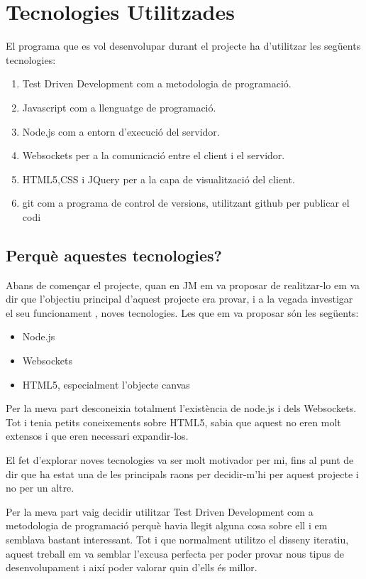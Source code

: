 \chapter{Tecnologies Utilitzades}
\label{sec:tecnologies}

El programa que es vol desenvolupar durant el projecte ha d'utilitzar les següents tecnologies: 

\begin{enumerate}
	\item{Test Driven Development com a metodologia de programació.}
	\item{Javascript com a llenguatge de programació.}
	\item{Node.js com a entorn d'execució del servidor.}
	\item{Websockets per a la comunicació entre el client i el servidor.}
	\item{HTML5,CSS i JQuery per a la capa de visualització del client.}
	\item{git com a programa de control de versions, utilitzant github per publicar el codi}
\end{enumerate}

\section{Perquè aquestes tecnologies?}

Abans de començar el projecte, quan en JM em va proposar de realitzar-lo em va dir que l'objectiu principal d'aquest projecte era provar, i a la vegada investigar el seu funcionament , noves tecnologies. Les que em va proposar són les següents: 
\begin{itemize}
	\item{Node.js}
	\item{Websockets}
	\item{HTML5, especialment l'objecte canvas}
\end{itemize}

Per la meva part desconeixia totalment l'existència de node.js i dels Websockets. Tot i tenia petits coneixements sobre HTML5, sabia que aquest no eren molt extensos i que eren necessari expandir-los.

El fet d'explorar noves tecnologies va ser molt motivador per mi, fins al punt de dir que ha estat una de les principals raons per decidir-m'hi per aquest projecte i no per un altre. 

Per la meva part vaig decidir utilitzar Test Driven Development com a metodologia de programació perquè havia llegit alguna cosa sobre ell i em semblava bastant interessant. Tot i que normalment utilitzo el disseny iteratiu, aquest treball em va semblar l'excusa perfecta per poder provar nous tipus de desenvolupament i així poder valorar quin d'ells és millor. 

